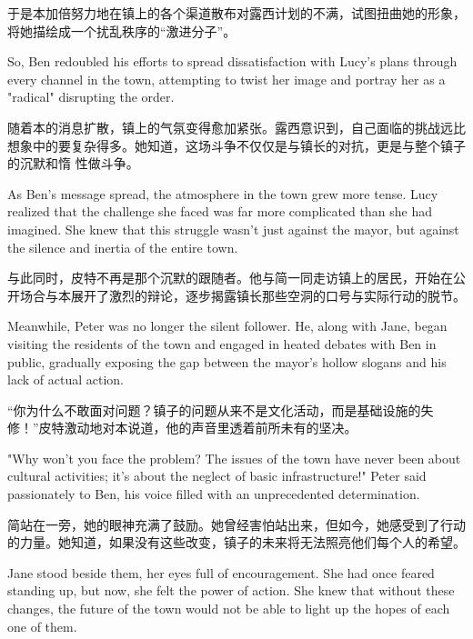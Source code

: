 于是本加倍努力地在镇上的各个渠道散布对露西计划的不满，试图扭曲她的形象，将她描绘成一个扰乱秩序的“激进分子”。

\begin{flushright}
    So, Ben redoubled his efforts to spread dissatisfaction with Lucy's plans
    through every channel in the town, attempting to twist her image and portray
    her as a "radical" disrupting the order.
\end{flushright}

随着本的消息扩散，镇上的气氛变得愈加紧张。露西意识到，自己面临的挑战远比想象中的要复杂得多。她知道，这场斗争不仅仅是与镇长的对抗，更是与整个镇子的沉默和惰
性做斗争。

\begin{flushright} As Ben's message spread, the atmosphere in the town grew
    more tense. Lucy realized that the challenge she faced was far more
    complicated
    than she had imagined. She knew that this struggle wasn’t just against the
    mayor, but against the silence and inertia of the entire town.
\end{flushright}

与此同时，皮特不再是那个沉默的跟随者。他与简一同走访镇上的居民，开始在公开场合与本展开了激烈的辩论，逐步揭露镇长那些空洞的口号与实际行动的脱节。

\begin{flushright}
    Meanwhile, Peter was no longer the silent follower. He, along with Jane, began
    visiting the residents of the town and engaged in heated debates with Ben in
    public, gradually exposing the gap between the mayor's hollow slogans and his
    lack of actual action.
\end{flushright}

“你为什么不敢面对问题？镇子的问题从来不是文化活动，而是基础设施的失修！”皮特激动地对本说道，他的声音里透着前所未有的坚决。

\begin{flushright}
    "Why won't you face the problem? The issues of the town have never been about
    cultural activities; it’s about the neglect of basic infrastructure!" Peter
    said passionately to Ben, his voice filled with an unprecedented determination.
\end{flushright}

简站在一旁，她的眼神充满了鼓励。她曾经害怕站出来，但如今，她感受到了行动的力量。她知道，如果没有这些改变，镇子的未来将无法照亮他们每个人的希望。

\begin{flushright}
    Jane stood beside them, her eyes full of encouragement. She had once feared
    standing up, but now, she felt the power of action. She knew that without these
    changes, the future of the town would not be able to light up the hopes of each
    one of them.
\end{flushright}


